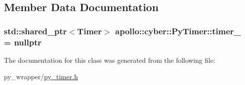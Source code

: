 \subsection{Member Data Documentation}
\hypertarget{classapollo_1_1cyber_1_1PyTimer_ab359c52c3a7f0727f7337be165b01b34}{
\subsubsection[{timer\-\_\-}]{\setlength{\rightskip}{0pt plus 5cm}std\-::shared\-\_\-ptr$<${\bf Timer}$>$ apollo\-::cyber\-::\-Py\-Timer\-::timer\-\_\- = nullptr\hspace{0.3cm}{\ttfamily [private]}}}\label{classapollo_1_1cyber_1_1PyTimer_ab359c52c3a7f0727f7337be165b01b34}


The documentation for this class was generated from the following file\-:\begin{DoxyCompactItemize}
\item 
py\-\_\-wrapper/\hyperlink{py__timer_8h}{py\-\_\-timer.\-h}\end{DoxyCompactItemize}
